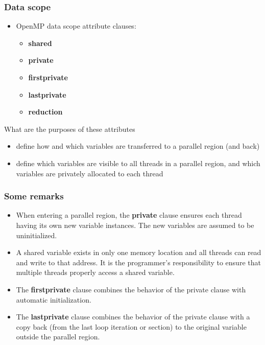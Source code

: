 \documentclass{beamer}
\begin{document}
\begin{frame}
\frametitle{Data scope}

\begin{block}{}
\begin{itemize}
\item OpenMP data scope attribute clauses:
\begin{itemize}

 \item \textbf{shared}

 \item \textbf{private}

 \item \textbf{firstprivate}

 \item \textbf{lastprivate}

 \item \textbf{reduction}
\end{itemize}

\noindent
\end{itemize}

\noindent
What are the purposes of these attributes
\begin{itemize}
\item define how and which variables are transferred to a parallel region (and back)

\item define which variables are visible to all threads in a parallel region, and which variables are privately allocated to each thread
\end{itemize}

\noindent
\end{block}
\end{frame}

\begin{frame}
\frametitle{Some remarks}

\begin{block}{}

\begin{itemize}
\item When entering a parallel region, the \textbf{private} clause ensures each thread having its own new variable instances. The new variables are assumed to be uninitialized.

\item A shared variable exists in only one memory location and all threads can read and write to that address. It is the programmer's responsibility to ensure that multiple threads properly access a shared variable.

\item The \textbf{firstprivate} clause combines the behavior of the private clause with automatic initialization.

\item The \textbf{lastprivate} clause combines the behavior of the private clause with a copy back (from the last loop iteration or section) to the original variable outside the parallel region.
\end{itemize}

\noindent
\end{block}
\end{frame}
\end{document}

